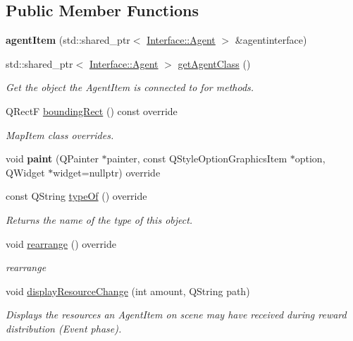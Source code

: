 \subsection*{Public Member Functions}
\begin{DoxyCompactItemize}
\item 
\hypertarget{classagent_item_a6d87887e2240103221eab8a6917bb0bd}{{\bfseries agent\-Item} (std\-::shared\-\_\-ptr$<$ \hyperlink{class_interface_1_1_agent}{Interface\-::\-Agent} $>$ \&agentinterface)}\label{classagent_item_a6d87887e2240103221eab8a6917bb0bd}

\item 
std\-::shared\-\_\-ptr$<$ \hyperlink{class_interface_1_1_agent}{Interface\-::\-Agent} $>$ \hyperlink{classagent_item_af468ed5f7e555583153d2e92742a7ea9}{get\-Agent\-Class} ()
\begin{DoxyCompactList}\small\item\em Get the object the Agent\-Item is connected to for methods. \end{DoxyCompactList}\item 
\hypertarget{classagent_item_afe2bae8bc4a79e3460dfa4c0435b1cb4}{Q\-Rect\-F \hyperlink{classagent_item_afe2bae8bc4a79e3460dfa4c0435b1cb4}{bounding\-Rect} () const override}\label{classagent_item_afe2bae8bc4a79e3460dfa4c0435b1cb4}

\begin{DoxyCompactList}\small\item\em Map\-Item class overrides. \end{DoxyCompactList}\item 
\hypertarget{classagent_item_ad9f32b1e5fbf18a30a744c3e861b05f7}{void {\bfseries paint} (Q\-Painter $\ast$painter, const Q\-Style\-Option\-Graphics\-Item $\ast$option, Q\-Widget $\ast$widget=nullptr) override}\label{classagent_item_ad9f32b1e5fbf18a30a744c3e861b05f7}

\item 
const Q\-String \hyperlink{classagent_item_abd6f80f1240de5abd8e54838d55c3794}{type\-Of} () override
\begin{DoxyCompactList}\small\item\em Returns the name of the type of this object. \end{DoxyCompactList}\item 
\hypertarget{classagent_item_a0b703d94f5e5d039a3563907d75054ed}{void \hyperlink{classagent_item_a0b703d94f5e5d039a3563907d75054ed}{rearrange} () override}\label{classagent_item_a0b703d94f5e5d039a3563907d75054ed}

\begin{DoxyCompactList}\small\item\em rearrange \end{DoxyCompactList}\item 
void \hyperlink{classagent_item_a42f6ff3f74e0ec4770cd60d288884066}{display\-Resource\-Change} (int amount, Q\-String path)
\begin{DoxyCompactList}\small\item\em Displays the resources an Agent\-Item on scene may have received during reward distribution (Event phase). \end{DoxyCompactList}\end{DoxyCompactItemize}
